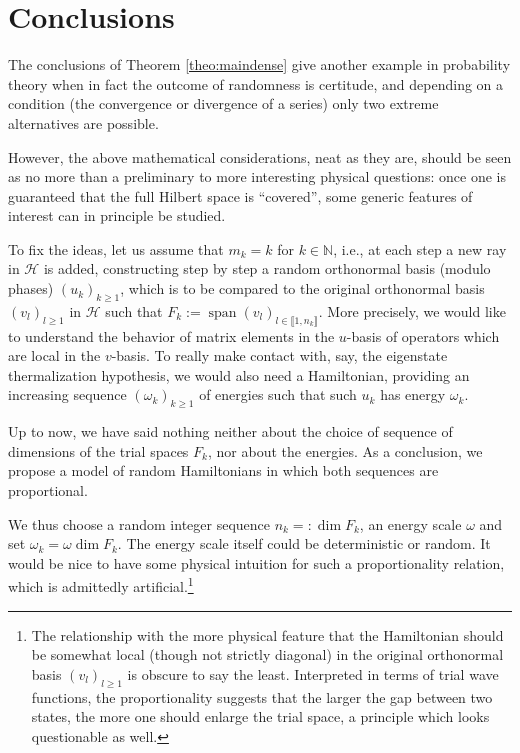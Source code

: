 \documentclass[pdftex]{sigma}%
\DeclareMathOperator{\psan}{span}
\newcommand{\hilH}{\mathcal H}
\newcommand{\kN}{k\in \mathbb{N}}
\newcommand{\intt}[1]{\llbracket #1 \rrbracket}
\begin{document}
\section{Conclusions} \label{sec:concl}

The conclusions of Theorem \ref{theo:maindense} give another example in probability theory when in fact the outcome of randomness is certitude, and depending on a condition (the convergence or divergence of a series) only two extreme alternatives are possible.

However, the above mathematical considerations, neat as they are, should be seen as no more than a preliminary to more interesting physical questions: once one is guaranteed that the full Hilbert space is ``covered'', some generic features of interest can in principle be studied.

To fix the ideas, let us assume that $m_k=k$ for $\kN$, i.e., at each step a new ray in $\hilH$ is added, constructing step by step a random orthonormal basis (modulo phases) $(u_k)_{k\geq 1}$, which is to be compared to the original orthonormal basis $(v_l)_{l\geq 1}$ in $\hilH$ such that $F_k:=\psan (v_l)_{l\in \intt{1,n_k}}$. More precisely, we would like to understand the behavior of matrix elements in the $u$-basis of operators which are local in the $v$-basis. To really make contact with, say, the eigenstate thermalization hypothesis, we would also need a Hamiltonian, providing an increasing sequence $(\omega_k)_{k\geq 1}$ of energies such that such $u_k$ has energy $\omega_k$.


Up to now, we have said nothing neither about the choice of sequence of dimensions of the trial spaces $F_k$, nor about the energies. As a conclusion, we propose a model of random Hamiltonians in which both sequences are proportional.

We thus choose a random integer sequence $n_k=:\dim F_k$, an energy scale $\omega$ and set $\omega_k=\omega \dim F_k$. The energy scale itself could be deterministic or random. It would be nice to have some physical intuition for such a proportionality relation, which is admittedly artificial.\footnote{The relationship with the more physical feature that the Hamiltonian should be somewhat local (though not strictly diagonal) in the original orthonormal basis $(v_l)_{l\geq 1}$ is obscure to say the least. Interpreted in terms of trial wave functions, the proportionality suggests that the larger the gap between two states, the more one should enlarge the trial space, a principle which looks questionable as well.}
\end{document}
